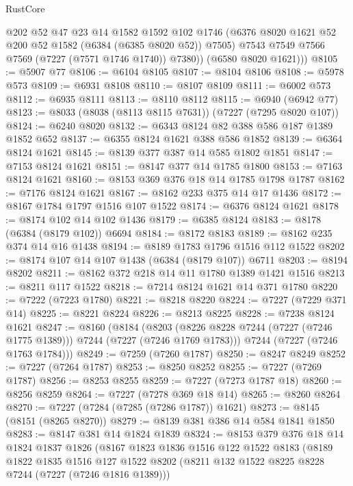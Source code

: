 \begin{lexlean}{RustCore}
\begin{coremodule}
            @202
            @52
            @47
            @23
            @14
            @1582
            @1592
            @102
            @1746
            (@6376 @8020 @1621 @52 @200 @52 @1582 (@6384 (@6385 @8020 @52)) @7505)
            @7543
            @7549
            @7566
            @7569
            (@7227 (@7571 @1746 @1740))
            @7380))
        (@6580 @8020 @1621)))
@8105 := @5907 @77
@8106 := @6104 @8105
@8107 := @8104 @8106
@8108 := @5978 @573
@8109 := @6931 @8108
@8110 := @8107 @8109
@8111 := @6002 @573
@8112 := @6935 @8111
@8113 := @8110 @8112
@8115 := @6940 (@6942 @77)
@8123 := @8033 (@8038 (@8113 @8115 @7631)) (@7227 (@7295 @8020 @107))
@8124 := @6240 @8020
@8132 := @6343 @8124 @82 @388 @586 @187 @1389 @1852 @652
@8137 := @6355 @8124 @1621 @388 @586 @1852
@8139 := @6364 @8124 @1621
@8145 := @8139 @377 @387 @14 @585 @1802 @1851
@8147 := @7153 @8124 @1621
@8151 := @8147 @377 @14 @1785 @1800
@8153 := @7163 @8124 @1621
@8160 := @8153 @369 @376 @18 @14 @1785 @1798 @1787
@8162 := @7176 @8124 @1621
@8167 := @8162 @233 @375 @14 @17 @1436
@8172 := @8167 @1784 @1797 @1516 @107 @1522
@8174 := @6376 @8124 @1621
@8178 := @8174 @102 @14 @102 @1436
@8179 := @6385 @8124
@8183 := @8178 (@6384 (@8179 @102)) @6694
@8184 := @8172 @8183
@8189 := @8162 @235 @374 @14 @16 @1438
@8194 := @8189 @1783 @1796 @1516 @112 @1522
@8202 := @8174 @107 @14 @107 @1438 (@6384 (@8179 @107)) @6711
@8203 := @8194 @8202
@8211 := @8162 @372 @218 @14 @11 @1780 @1389 @1421 @1516
@8213 := @8211 @117 @1522
@8218 := @7214 @8124 @1621 @14 @371 @1780
@8220 := @7222 (@7223 @1780)
@8221 := @8218 @8220
@8224 := @7227 (@7229 @371 @14)
@8225 := @8221 @8224
@8226 := @8213 @8225
@8228 := @7238 @8124 @1621
@8247 := @8160
    (@8184
      (@8203 (@8226 @8228 @7244 (@7227 (@7246 @1775 @1389))) @7244 (@7227 (@7246 @1769 @1783)))
      @7244
      (@7227 (@7246 @1763 @1784)))
@8249 := @7259 (@7260 @1787)
@8250 := @8247 @8249
@8252 := @7227 (@7264 @1787)
@8253 := @8250 @8252
@8255 := @7227 (@7269 @1787)
@8256 := @8253 @8255
@8259 := @7227 (@7273 @1787 @18)
@8260 := @8256 @8259
@8264 := @7227 (@7278 @369 @18 @14)
@8265 := @8260 @8264
@8270 := @7227 (@7284 (@7285 (@7286 @1787)) @1621)
@8273 := @8145 (@8151 (@8265 @8270))
@8279 := @8139 @381 @386 @14 @584 @1841 @1850
@8283 := @8147 @381 @14 @1824 @1839
@8324 := @8153
    @379
    @376
    @18
    @14
    @1824
    @1837
    @1826
    (@8167
      @1823
      @1836
      @1516
      @122
      @1522
      @8183
      (@8189
        @1822
        @1835
        @1516
        @127
        @1522
        @8202
        (@8211 @132 @1522 @8225 @8228 @7244 (@7227 (@7246 @1816 @1389)))

\end{coremodule}
\end{lexlean}

